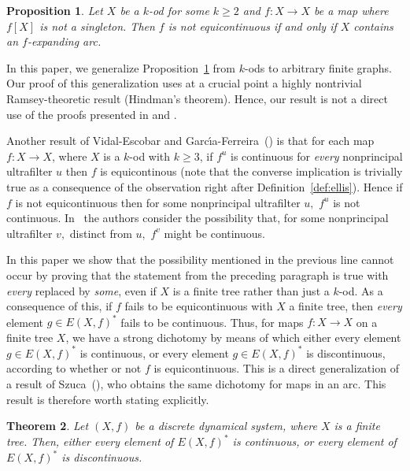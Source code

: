 \documentclass[12pt]{amsart}
\newtheorem{theorem}{Theorem}[section]
\newtheorem{proposition}[theorem]{Proposition}
\theoremstyle{definition}
\numberwithin{equation}{section}
\begin{document}
\begin{proposition}\label{simple-f-expanding}
Let $X$ be a $k$-od for some $k\geq 2$ and $f:X\longrightarrow X$ be a map where $f[X]$ is not a singleton. Then $f$ is not equicontinuous if and only if $X$ contains an $f$-expanding arc.
\end{proposition}

In this paper, we generalize Proposition~\ref{simple-f-expanding} from $k$-ods to arbitrary finite graphs. Our proof 
of this generalization uses at a crucial point a highly nontrivial Ramsey-theoretic result (Hindman's theorem). 
Hence, our result is not a direct use of the proofs presented in \cite[Theorem 1.2]{bruckner-ceder} and
\cite[Theorems~3.1 and 3.7]{ivon-salvador}.
 
Another result of Vidal-Escobar and Garc\'{\i}a-Ferreira~(\cite[Theorem~3.7]{ivon-salvador}) is that 
for each map $f:X\longrightarrow X$, where $X$ is a $k$-od with $k\geq 3$, if $f^u$ is continuous for {\em every} nonprincipal ultrafilter $u$ then $f$ is equicontinous (note that the converse implication is trivially true as a consequence of the observation right after Definition~\ref{def:ellis}). Hence if $f$ is not equicontinuous then for some nonprincipal ultrafilter $u,$ $f^u$ is not continuous. In~\cite{ivon-salvador} the authors consider the possibility that, for some nonprincipal ultrafilter $v,$ distinct from $u,$ $f^v$ might be continuous.

In this paper we show that the possibility mentioned in the previous line cannot occur by proving that the statement from the preceding paragraph is true with {\em every} replaced by {\sl some}, even if $X$ is a finite tree rather than just a $k$-od.  As a consequence of this, if $f$ fails to be equicontinuous with $X$ a finite tree, then 
{\em every} element $g\in E(X,f)^*$ fails to be continuous. Thus, for maps 
$f \colon X\longrightarrow X$ on a finite tree $X$, we have a strong dichotomy by means of which either every element $g\in E(X,f)^*$ is continuous, or every element $g\in E(X,f)^*$ is discontinuous, according to whether or not $f$ is equicontinuous. This is a direct generalization of a result of Szuca~(\cite[Theorem~2]{szuca}), who obtains the same dichotomy for maps in an arc. This result is therefore worth stating explicitly.

\begin{theorem}
Let $(X,f)$ be a discrete dynamical system, where $X$ is a finite tree. Then, either every element of $E(X,f)^*$ is continuous, or every element of $E(X,f)^*$ is discontinuous.
\end{theorem}
\end{document}

